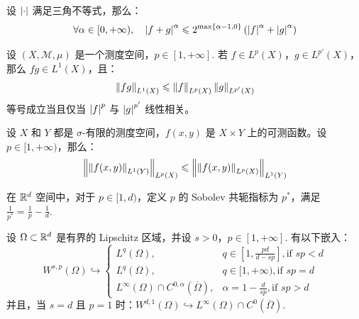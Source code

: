\begin{lemma}\label{lemma: Discrete Holder inequality}
	设 \(\left\lvert\cdot\right\rvert\) 满足三角不等式，那么：
	\begin{equation}
		\forall \alpha \in [0, +\infty), \quad 
		\left\lvert f + g\right\rvert^{\alpha} \leqslant 2^{\max\left\{\alpha-1, 0\right\}} \left(\left\lvert f\right\rvert^{\alpha} + \left\lvert g\right\rvert^{\alpha}\right)
	\end{equation}
\end{lemma}

\begin{theorem}
	设 \(\left(X, \mathcal{M}, \mu\right)\) 是一个测度空间，\(p \in [1, +\infty]\). 若 \(f \in L^{p}(X)\)，\(g \in L^{p'}(X)\)，那么 \(f g \in L^{1}(X)\)，且：
	\begin{equation}
		\left\lVert f g\right\rVert_{L^1(X)} \leqslant \left\lVert f\right\rVert_{L^{p}(X)} \left\lVert g\right\rVert_{L^{p'}(X)}
	\end{equation}
	等号成立当且仅当 \(\left\lvert f\right\rvert^{p}\) 与 \(\left\lvert g\right\rvert^{p'}\) 线性相关。
\end{theorem}

\begin{theorem}
	设 \(X\) 和 \(Y\) 都是 \(\sigma\)-有限的测度空间，\(f(x,y)\) 是 \(X \times Y\) 上的可测函数。设 \(p \in [1, +\infty)\)，那么：
	\begin{equation}
		\left\lVert\left\lVert f(x,y)\right\rVert_{L^{1}(Y)}\right\rVert_{L^{p}(X)} \leqslant \left\lVert\left\lVert f(x,y)\right\rVert_{L^{p}(X)}\right\rVert_{L^{1}(Y)}
	\end{equation}
\end{theorem}

\begin{definition}
	在 \(\mathbb{R}^d\) 空间中，对于 \(p \in [1, d)\)，定义 \(p\) 的 Sobolev 共轭指标为 \(p^{\ast}\)，满足 \(\frac{1}{p^{\ast}} = \frac{1}{p} - \frac{1}{d}\).
\end{definition}

\begin{theorem}
	设 \(\Omega \subset \mathbb{R}^{d}\) 是有界的 Lipschitz 区域，并设 \(s > 0\)，\(p \in [1, +\infty]\). 有以下嵌入：
	\begin{equation}
		W^{s, p}(\Omega) 
		\hookrightarrow \begin{cases}
			L^{q}(\Omega), & q \in [1, \frac{p d}{d - s p}], \text{if \(s p < d\)} \\
			L^{q}(\Omega), & q \in [1, +\infty), \text{if \(s p = d\)} \\
			L^{\infty}(\Omega) \cap C^{0,\alpha}(\overline{\Omega}), & \alpha = 1-\frac{d}{sp}, \text{if \(s p > d\)}
		\end{cases}
	\end{equation}
	并且，当 \(s = d\) 且 \(p = 1\) 时：\(W^{d, 1}(\Omega) \hookrightarrow L^{\infty}(\Omega) \cap C^{0}(\overline{\Omega})\).
\end{theorem}

